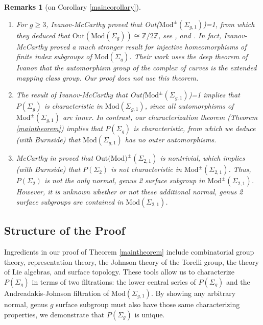 \documentclass[a4paper]{amsproc}
\theoremstyle{TheoremNum}
\theoremstyle{Theorembold}
\theoremstyle{TheoremboldDef}
\theoremstyle{TheoremboldRem}
\newtheorem*{remarks}{Remarks}
\theoremstyle{TheoremboldRem}
\begin{document}
\begin{remarks}[on Corollary \ref{maincorollary}]\ \\
\vspace{-.4cm}
\begin{enumerate}[label=\arabic*.,leftmargin=1.5cm]
\item For $g{\geqslant} 3$, Ivanov-McCarthy proved that Out(${\text{Mod}^\pm(\Sigma_{g,1})}$)=1, from which they deduced that $\text{Out}({\text{Mod}(\Sigma_g)})\cong {\mathbb{Z}}/2{\mathbb{Z}}$, see \cite{IvanovMccarthy}, \cite[Th.5]{ivanov1984} and \cite[Th.1]{McCtrivout}. In fact, Ivanov-McCarthy proved a much stronger result for injective homeomorphisms of finite index subgroups of ${\text{Mod}(\Sigma_g)}$. Their work uses the deep theorem of Ivanov that the automorphism group of the complex of curves is the extended mapping class group. Our proof does not use this theorem. \\
\item The result of Ivanov-McCarthy that Out(${\text{Mod}^\pm(\Sigma_{g,1})}$)=1 implies that $P({\Sigma_{g}})$ is characteristic in ${\text{Mod}(\Sigma_{g,1})}$, since all automorphisms of ${\text{Mod}^\pm(\Sigma_{g,1})}$ are inner.  In contrast, our characterization theorem (Theorem \ref{maintheorem}) implies that $P({\Sigma_{g}})$ is characteristic, from which we deduce (with Burnside) that ${\text{Mod}(\Sigma_{g,1})}$ has no outer automorphisms.\\
\item McCarthy in \cite{McCtrivout} proved that $\text{Out(Mod)}^\pm(\Sigma_{2,1})$ is nontrivial, which implies (with Burnside) that $P(\Sigma_{2})$ is not characteristic in $\text{Mod}^\pm(\Sigma_{2,1})$. Thus, $P(\Sigma_2)$ is not the only normal, genus 2 surface subgroup in $\text{Mod}^\pm(\Sigma_{2,1})$. However, it is unknown whether or not these additional normal, genus 2 surface subgroups are contained in $\text{Mod}(\Sigma_{2,1})$.\\
\end{enumerate}
 \end{remarks}

\subsection{Structure of the Proof} Ingredients in our proof of Theorem \ref{maintheorem} include combinatorial group theory, representation theory, the Johnson theory of the Torelli group, the theory of Lie algebras, and surface topology. These tools allow us to characterize $P({\Sigma_{g}})$ in terms of two filtrations: the lower central series of $P({\Sigma_{g}})$ and the Andreadakis-Johnson filtration of ${\text{Mod}(\Sigma_{g,1})}$. By showing any arbitrary normal, genus $g$ surface subgroup must also have those same characterizing properties, we demonstrate that $P({\Sigma_{g}})$ is unique.\\
\end{document}
